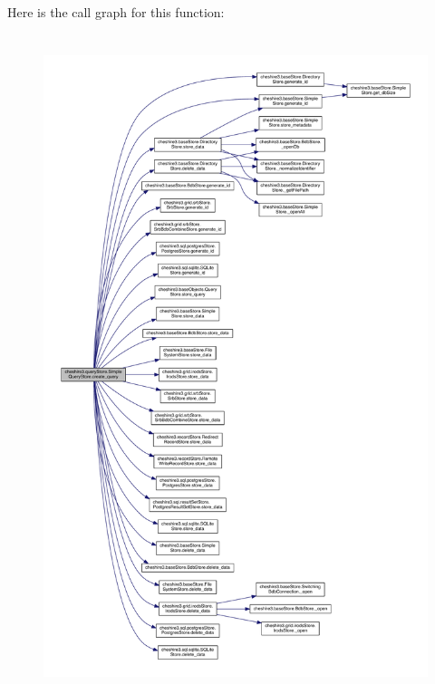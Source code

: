 Here is the call graph for this function\-:
\nopagebreak
\begin{figure}[H]
\begin{center}
\leavevmode
\includegraphics[height=550pt]{classcheshire3_1_1query_store_1_1_simple_query_store_acd293eeeac0cdb865b474c796d8805eb_cgraph}
\end{center}
\end{figure}


